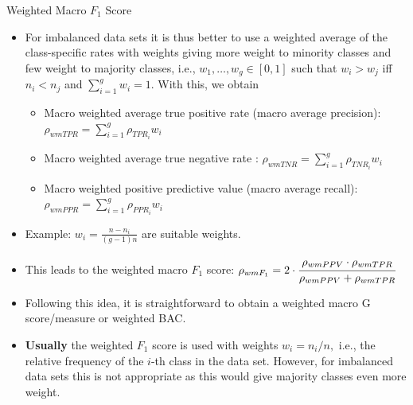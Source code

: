 \documentclass[11pt,compress,t,notes=noshow, xcolor=table]{beamer}
\begin{document}
\begin{vbframe}{Weighted Macro $F_1$ Score}
	\footnotesize{
	\begin{itemize}
%		
		\item For imbalanced data sets it is thus better to use a weighted average of the class-specific rates with weights giving more weight to minority classes and few weight to majority classes, i.e., $w_1,\ldots,w_g \in[0,1]$  such that $w_i > w_j$ iff $n_i < n_j$ and $\sum_{i=1}^g w_i = 1.$
%		
		With this, we obtain
		\begin{itemize}
			\footnotesize
			\item Macro weighted average true positive rate (macro average precision): $\rho_{wmTPR} = \sum_{i=1}^g  \rho_{TPR_i} w_i$
			\item Macro weighted average true negative rate : $\rho_{wmTNR} = \sum_{i=1}^g  \rho_{TNR_i} w_i$
			\item Macro weighted positive predictive value (macro average recall): $\rho_{wmPPR} = \sum_{i=1}^g  \rho_{PPR_i} w_i$
		\end{itemize}
%	 
		\item Example: $w_i = \frac{n - n_i}{(g-1)n}$ are suitable weights.
		\item This leads to the weighted macro $F_1$ score:
		$\rho_{wmF_1} = 2 \cdot \cfrac{\rho_{wmPPV} \cdot \rho_{wmTPR}}{\rho_{wmPPV} + 
			\rho_{wmTPR}}$
		\item Following this idea, it is straightforward to obtain a weighted macro G score/measure or weighted BAC.
%		
		\item \textbf{Usually} the weighted $F_1$ score is used with weights $w_i = n_i/n,$ i.e., the relative frequency of the $i$-th class in the data set. However, for imbalanced data sets  this is not appropriate as this would give majority classes even more weight.
%
	\end{itemize}
	}
\end{vbframe}
\end{document}
